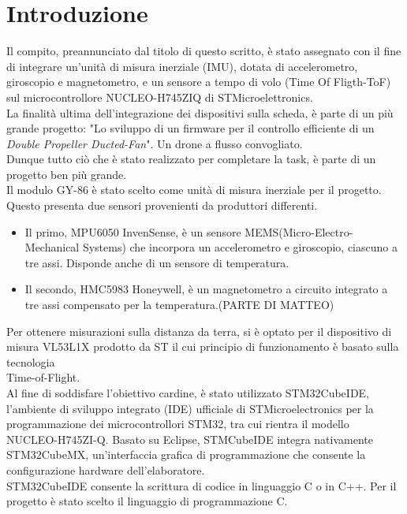 \documentclass[11pt]{report}
\begin{document}
\tableofcontents
{}
\newpage

\pagestyle{plain}

\section*{Introduzione}
Il compito, preannunciato dal titolo di questo scritto, è stato assegnato con il fine di integrare un'unità di misura inerziale (IMU), dotata di accelerometro, giroscopio e magnetometro, e un sensore a tempo di volo (Time Of Fligth-ToF) sul microcontrollore  NUCLEO-H745ZIQ di STMicroelettronics.\\
La finalità ultima dell'integrazione dei dispositivi sulla scheda, è parte di un più grande progetto: "Lo sviluppo di un firmware per il controllo efficiente di un \textit{Double Propeller Ducted-Fan}". Un drone a flusso convogliato.\\
Dunque tutto ciò che è stato realizzato per completare la task, è parte di un progetto ben più grande.\\
Il modulo GY-86 è stato scelto come unità di misura inerziale per il progetto. Questo presenta due sensori provenienti da produttori differenti. 
\begin{itemize}
    \item Il primo, MPU6050 InvenSense, è un sensore MEMS(Micro-Electro-Mechanical Systems) che incorpora un accelerometro e giroscopio, ciascuno a tre assi. Disponde anche di un sensore di temperatura.\\
    \item Il secondo, HMC5983 Honeywell, è un magnetometro a circuito integrato a tre assi compensato per la temperatura.(PARTE DI MATTEO)
\end{itemize}
Per ottenere misurazioni sulla distanza da terra, si è optato per il dispositivo di misura VL53L1X prodotto da ST il cui principio di funzionamento è basato sulla tecnologia \\Time-of-Flight.\\
Al fine di soddisfare l'obiettivo cardine, è stato utilizzato STM32CubeIDE, l'ambiente di sviluppo integrato (IDE) ufficiale di STMicroelectronics per la programmazione dei microcontrollori STM32, tra cui rientra il modello  NUCLEO-H745ZI-Q. 
Basato su Eclipse, STMCubeIDE integra nativamente STM32CubeMX, un'interfaccia grafica di programmazione che consente la configurazione hardware dell'elaboratore.\\
STM32CubeIDE consente la scrittura di codice in linguaggio C o in C++. Per il progetto è stato scelto il linguaggio di programmazione C.
\end{document}
